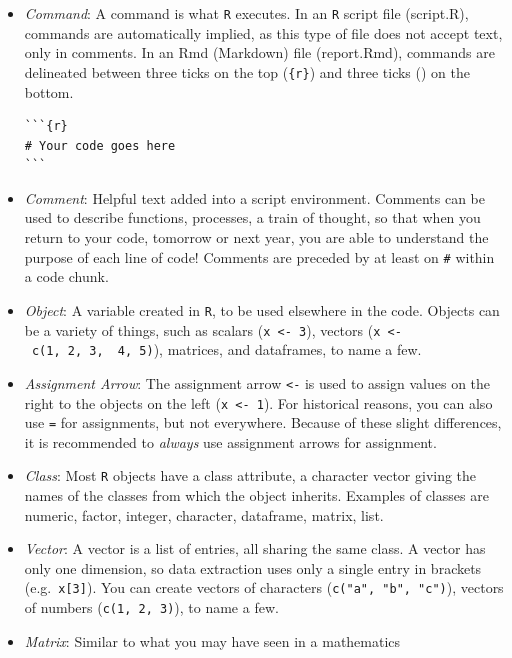 \documentclass[
  10pt,
  letterpaper,
  twoside,
  openright]{book}
\begin{document}
\begin{itemize}
\item
  \emph{Command}: A command is what \texttt{R} executes. In an
  \texttt{R} script file (script.R), commands are automatically implied,
  as this type of file does not accept text, only in comments. In an Rmd
  (Markdown) file (report.Rmd), commands are delineated between three
  ticks on the top
  (\texttt{\textasciigrave{}\textasciigrave{}\textasciigrave{}\{r\}})
  and three ticks
  (\texttt{\textasciigrave{}\textasciigrave{}\textasciigrave{}}) on the
  bottom.

\begin{verbatim}
```{r}
# Your code goes here
```  
\end{verbatim}
\item
  \emph{Comment}: Helpful text added into a script environment. Comments
  can be used to describe functions, processes, a train of thought, so
  that when you return to your code, tomorrow or next year, you are able
  to understand the purpose of each line of code! Comments are preceded
  by at least on \texttt{\#} within a code chunk.
\item
  \emph{Object}: A variable created in \texttt{R}, to be used elsewhere
  in the code. Objects can be a variety of things, such as scalars
  (\texttt{x\ \textless{}-\ 3}), vectors
  (\texttt{x\ \textless{}-\ c(1,\ 2,\ 3,\ \ 4,\ 5)}), matrices, and
  dataframes, to name a few.
\item
  \emph{Assignment Arrow}: The assignment arrow \texttt{\textless{}-} is
  used to assign values on the right to the objects on the left
  (\texttt{x\ \textless{}-\ 1}). For historical reasons, you can also
  use \texttt{=} for assignments, but not everywhere. Because of these
  slight differences, it is recommended to \emph{always} use assignment
  arrows for assignment.
\item
  \emph{Class}: Most \texttt{R} objects have a class attribute, a
  character vector giving the names of the classes from which the object
  inherits. Examples of classes are numeric, factor, integer, character,
  dataframe, matrix, list.
\item
  \emph{Vector}: A vector is a list of entries, all sharing the same
  class. A vector has only one dimension, so data extraction uses only a
  single entry in brackets (e.g.~\texttt{x{[}3{]}}). You can create
  vectors of characters (\texttt{c("a",\ "b",\ "c")}), vectors of
  numbers (\texttt{c(1,\ 2,\ 3)}), to name a few.
\item
  \emph{Matrix}: Similar to what you may have seen in a mathematics

\end{itemize}
\end{document}
